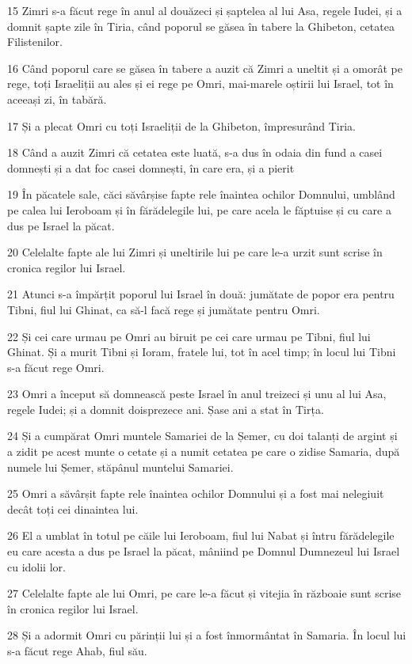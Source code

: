 \par 15 Zimri s-a făcut rege în anul al douăzeci și șaptelea al lui Asa, regele Iudei, și a domnit șapte zile în Tiria, când poporul se găsea în tabere la Ghibeton, cetatea Filistenilor.
\par 16 Când poporul care se găsea în tabere a auzit că Zimri a uneltit și a omorât pe rege, toți Israeliții au ales și ei rege pe Omri, mai-marele oștirii lui Israel, tot în aceeași zi, în tabără.
\par 17 Și a plecat Omri cu toți Israeliții de la Ghibeton, împresurând Tiria.
\par 18 Când a auzit Zimri că cetatea este luată, s-a dus în odaia din fund a casei domnești și a dat foc casei domnești, în care era, și a pierit
\par 19 În păcatele sale, căci săvârșise fapte rele înaintea ochilor Domnului, umblând pe calea lui Ieroboam și în fărădelegile lui, pe care acela le făptuise și cu care a dus pe Israel la păcat.
\par 20 Celelalte fapte ale lui Zimri și uneltirile lui pe care le-a urzit sunt scrise în cronica regilor lui Israel.
\par 21 Atunci s-a împărțit poporul lui Israel în două: jumătate de popor era pentru Tibni, fiul lui Ghinat, ca să-l facă rege și jumătate pentru Omri.
\par 22 Și cei care urmau pe Omri au biruit pe cei care urmau pe Tibni, fiul lui Ghinat. Și a murit Tibni și Ioram, fratele lui, tot în acel timp; în locul lui Tibni s-a făcut rege Omri.
\par 23 Omri a început să domnească peste Israel în anul treizeci și unu al lui Asa, regele Iudei; și a domnit doisprezece ani. Șase ani a stat în Tirța.
\par 24 Și a cumpărat Omri muntele Samariei de la Șemer, cu doi talanți de argint și a zidit pe acest munte o cetate și a numit cetatea pe care o zidise Samaria, după numele lui Șemer, stăpânul muntelui Samariei.
\par 25 Omri a săvârșit fapte rele înaintea ochilor Domnului și a fost mai nelegiuit decât toți cei dinaintea lui.
\par 26 El a umblat în totul pe căile lui Ieroboam, fiul lui Nabat și întru fărădelegile eu care acesta a dus pe Israel la păcat, mâniind pe Domnul Dumnezeul lui Israel cu idolii lor.
\par 27 Celelalte fapte ale lui Omri, pe care le-a făcut și vitejia în războaie sunt scrise în cronica regilor lui Israel.
\par 28 Și a adormit Omri cu părinții lui și a fost înmormântat în Samaria. În locul lui s-a făcut rege Ahab, fiul său.
